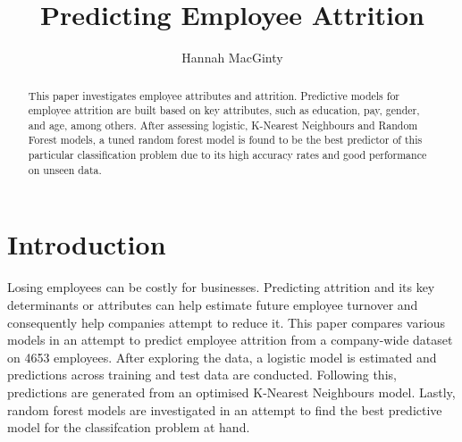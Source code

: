 \documentclass[11pt,preprint, authoryear]{elsarticle}
\numberwithin{equation}{section}
\numberwithin{figure}{section}
\numberwithin{table}{section}
\begin{document}
\begin{frontmatter}  %

\title{Predicting Employee Attrition}





\author[Add1]{Hannah MacGinty}





\address[Add1]{Stellenbosch University, South Africa}


\begin{abstract}
\small{
This paper investigates employee attributes and attrition. Predictive
models for employee attrition are built based on key attributes, such as
education, pay, gender, and age, among others. After assessing logistic,
K-Nearest Neighbours and Random Forest models, a tuned random forest
model is found to be the best predictor of this particular
classification problem due to its high accuracy rates and good
performance on unseen data.
}
\end{abstract}

\vspace{1cm}





\vspace{0.5cm}

\end{frontmatter}

\setcounter{footnote}{0}



\pagestyle{fancy}
\chead{}
\rhead{}
\lfoot{}
\lhead{}
\cfoot{}


\headsep 35pt %




\hypertarget{introduction}{%
\section*{Introduction}\label{introduction}}

Losing employees can be costly for businesses. Predicting attrition and
its key determinants or attributes can help estimate future employee
turnover and consequently help companies attempt to reduce it. This
paper compares various models in an attempt to predict employee
attrition from a company-wide dataset on 4653 employees. After exploring
the data, a logistic model is estimated and predictions across training
and test data are conducted. Following this, predictions are generated
from an optimised K-Nearest Neighbours model. Lastly, random forest
models are investigated in an attempt to find the best predictive model
for the classifcation problem at hand.
\end{document}
